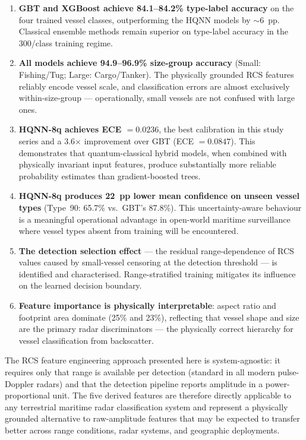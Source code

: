 \documentclass[journal]{IEEEtran}
\begin{document}
\begin{enumerate}
  \item \textbf{GBT and XGBoost achieve 84.1--84.2\% type-label accuracy}
        on the four trained vessel classes, outperforming the HQNN models
        by $\sim$6~pp. Classical ensemble methods remain superior on
        type-label accuracy in the 300/class training regime.

  \item \textbf{All models achieve 94.9--96.9\% size-group accuracy}
        (Small: Fishing/Tug; Large: Cargo/Tanker). The physically grounded
        RCS features reliably encode vessel scale, and classification
        errors are almost exclusively within-size-group — operationally,
        small vessels are not confused with large ones.

  \item \textbf{HQNN-8q achieves ECE $= 0.0236$}, the best calibration
        in this study series and a 3.6$\times$ improvement over GBT
        (ECE $= 0.0847$). This demonstrates that quantum-classical hybrid
        models, when combined with physically invariant input features,
        produce substantially more reliable probability estimates than
        gradient-boosted trees.

  \item \textbf{HQNN-8q produces 22~pp lower mean confidence on unseen
        vessel types} (Type~90: 65.7\% vs.\ GBT's 87.8\%). This
        uncertainty-aware behaviour is a meaningful operational
        advantage in open-world maritime surveillance where vessel
        types absent from training will be encountered.

  \item \textbf{The detection selection effect} — the residual
        range-dependence of RCS values caused by small-vessel censoring
        at the detection threshold — is identified and characterised.
        Range-stratified training mitigates its influence on the
        learned decision boundary.

  \item \textbf{Feature importance is physically interpretable}:
        aspect ratio and footprint area dominate (25\% and 23\%),
        reflecting that vessel shape and size are the primary radar
        discriminators — the physically correct hierarchy for vessel
        classification from backscatter.
\end{enumerate}

\medskip
The RCS feature engineering approach presented here is system-agnostic:
it requires only that range is available per detection (standard in all
modern pulse-Doppler radars) and that the detection pipeline reports
amplitude in a power-proportional unit. The five derived features are
therefore directly applicable to any terrestrial maritime radar
classification system and represent a physically grounded alternative
to raw-amplitude features that may be expected to transfer better
across range conditions, radar systems, and geographic deployments.
\end{document}
